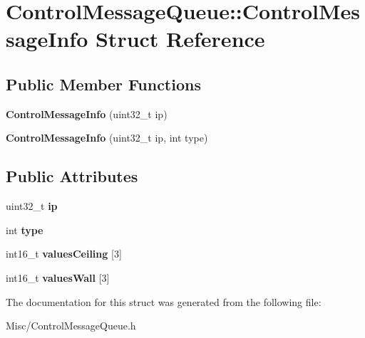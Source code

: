 \hypertarget{structControlMessageQueue_1_1ControlMessageInfo}{}\section{Control\+Message\+Queue\+:\+:Control\+Message\+Info Struct Reference}
\label{structControlMessageQueue_1_1ControlMessageInfo}
\subsection*{Public Member Functions}
\begin{DoxyCompactItemize}
\item 
\mbox{\label{structControlMessageQueue_1_1ControlMessageInfo_a343b872010632c73cd5d811f0439db65}} 
{\bfseries Control\+Message\+Info} (uint32\+\_\+t ip)
\item 
\mbox{\label{structControlMessageQueue_1_1ControlMessageInfo_ab3d25b3f23c684a35f85ecad82c4b0de}} 
{\bfseries Control\+Message\+Info} (uint32\+\_\+t ip, int type)
\end{DoxyCompactItemize}
\subsection*{Public Attributes}
\begin{DoxyCompactItemize}
\item 
\mbox{\label{structControlMessageQueue_1_1ControlMessageInfo_a9c729d9dd8e2bbabfbdfcdaf845065f6}} 
uint32\+\_\+t {\bfseries ip}
\item 
\mbox{\label{structControlMessageQueue_1_1ControlMessageInfo_a0166019e4c749c1fcea08074c641af3e}} 
int {\bfseries type}
\item 
\mbox{\label{structControlMessageQueue_1_1ControlMessageInfo_aab343940b8582a6f6b0a36b16879b685}} 
int16\+\_\+t {\bfseries values\+Ceiling} \mbox{[}3\mbox{]}
\item 
\mbox{\label{structControlMessageQueue_1_1ControlMessageInfo_a7a3bd15c760863933774d32359cf4411}} 
int16\+\_\+t {\bfseries values\+Wall} \mbox{[}3\mbox{]}
\end{DoxyCompactItemize}


The documentation for this struct was generated from the following file\+:\begin{DoxyCompactItemize}
\item 
Misc/Control\+Message\+Queue.\+h\end{DoxyCompactItemize}
